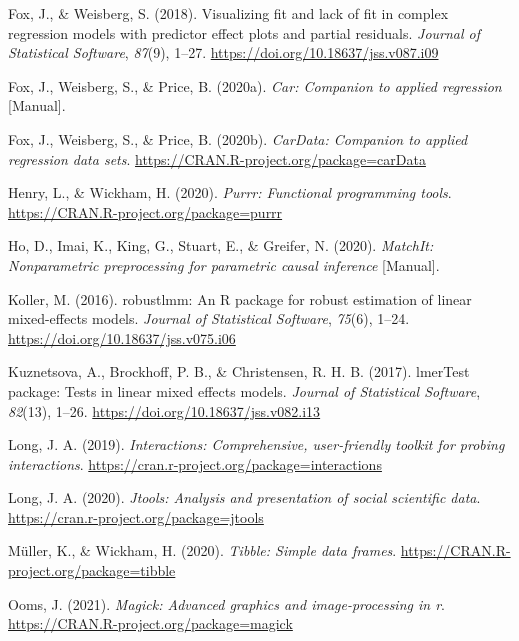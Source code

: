 \documentclass[
  english,
  man, noextraspace]{apa7}
\begin{document}
\begin{appendix}
\leavevmode\hypertarget{ref-R-effects_a}{}%
Fox, J., \& Weisberg, S. (2018). Visualizing fit and lack of fit in
complex regression models with predictor effect plots and partial
residuals. \emph{Journal of Statistical Software}, \emph{87}(9), 1--27.
\url{https://doi.org/10.18637/jss.v087.i09}

\leavevmode\hypertarget{ref-R-car}{}%
Fox, J., Weisberg, S., \& Price, B. (2020a). \emph{Car: Companion to
applied regression} {[}Manual{]}.

\leavevmode\hypertarget{ref-R-carData}{}%
Fox, J., Weisberg, S., \& Price, B. (2020b). \emph{CarData: Companion to
applied regression data sets}.
\url{https://CRAN.R-project.org/package=carData}

\leavevmode\hypertarget{ref-R-purrr}{}%
Henry, L., \& Wickham, H. (2020). \emph{Purrr: Functional programming
tools}. \url{https://CRAN.R-project.org/package=purrr}

\leavevmode\hypertarget{ref-R-MatchIt}{}%
Ho, D., Imai, K., King, G., Stuart, E., \& Greifer, N. (2020).
\emph{MatchIt: Nonparametric preprocessing for parametric causal
inference} {[}Manual{]}.

\leavevmode\hypertarget{ref-R-robustlmm}{}%
Koller, M. (2016). robustlmm: An R package for robust estimation of
linear mixed-effects models. \emph{Journal of Statistical Software},
\emph{75}(6), 1--24. \url{https://doi.org/10.18637/jss.v075.i06}

\leavevmode\hypertarget{ref-R-lmerTest}{}%
Kuznetsova, A., Brockhoff, P. B., \& Christensen, R. H. B. (2017).
lmerTest package: Tests in linear mixed effects models. \emph{Journal of
Statistical Software}, \emph{82}(13), 1--26.
\url{https://doi.org/10.18637/jss.v082.i13}

\leavevmode\hypertarget{ref-R-interactions}{}%
Long, J. A. (2019). \emph{Interactions: Comprehensive, user-friendly
toolkit for probing interactions}.
\url{https://cran.r-project.org/package=interactions}

\leavevmode\hypertarget{ref-R-jtools}{}%
Long, J. A. (2020). \emph{Jtools: Analysis and presentation of social
scientific data}. \url{https://cran.r-project.org/package=jtools}

\leavevmode\hypertarget{ref-R-tibble}{}%
Müller, K., \& Wickham, H. (2020). \emph{Tibble: Simple data frames}.
\url{https://CRAN.R-project.org/package=tibble}

\leavevmode\hypertarget{ref-R-magick}{}%
Ooms, J. (2021). \emph{Magick: Advanced graphics and image-processing in
r}. \url{https://CRAN.R-project.org/package=magick}


\end{appendix}
\end{document}
